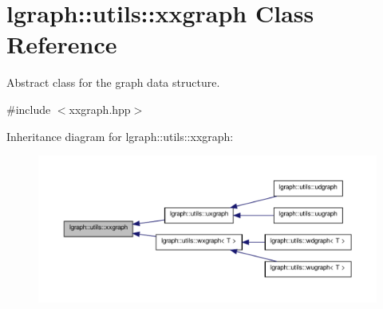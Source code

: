 \hypertarget{classlgraph_1_1utils_1_1xxgraph}{\section{lgraph\-:\-:utils\-:\-:xxgraph Class Reference}
\label{classlgraph_1_1utils_1_1xxgraph}
}


Abstract class for the graph data structure.  




{\ttfamily \#include $<$xxgraph.\-hpp$>$}



Inheritance diagram for lgraph\-:\-:utils\-:\-:xxgraph\-:\nopagebreak
\begin{figure}[H]
\begin{center}
\leavevmode
\includegraphics[width=350pt]{classlgraph_1_1utils_1_1xxgraph__inherit__graph}
\end{center}
\end{figure}
